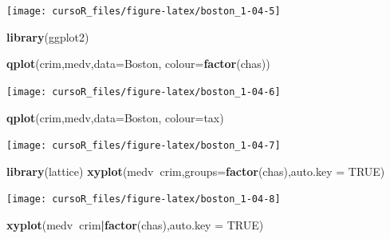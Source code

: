 \documentclass[]{book}
\newenvironment{Shaded}{\begin{snugshade}}{\end{snugshade}}
\newcommand{\KeywordTok}[1]{\textcolor[rgb]{0.13,0.29,0.53}{\textbf{#1}}}
\newcommand{\DataTypeTok}[1]{\textcolor[rgb]{0.13,0.29,0.53}{#1}}
\newcommand{\OtherTok}[1]{\textcolor[rgb]{0.56,0.35,0.01}{#1}}
\newcommand{\OperatorTok}[1]{\textcolor[rgb]{0.81,0.36,0.00}{\textbf{#1}}}
\newcommand{\NormalTok}[1]{#1}
\begin{document}
\begin{center}\texttt{[image: cursoR\_files/figure-latex/boston\_1-04-5]} \end{center}

\begin{Shaded}
\begin{Highlighting}[]
\KeywordTok{library}\NormalTok{(ggplot2)}

\KeywordTok{qplot}\NormalTok{(crim,medv,}\DataTypeTok{data=}\NormalTok{Boston, }\DataTypeTok{colour=}\KeywordTok{factor}\NormalTok{(chas))}
\end{Highlighting}
\end{Shaded}

\begin{center}\texttt{[image: cursoR\_files/figure-latex/boston\_1-04-6]} \end{center}

\begin{Shaded}
\begin{Highlighting}[]
\KeywordTok{qplot}\NormalTok{(crim,medv,}\DataTypeTok{data=}\NormalTok{Boston, }\DataTypeTok{colour=}\NormalTok{tax)}
\end{Highlighting}
\end{Shaded}

\begin{center}\texttt{[image: cursoR\_files/figure-latex/boston\_1-04-7]} \end{center}

\begin{Shaded}
\begin{Highlighting}[]
\KeywordTok{library}\NormalTok{(lattice)}
\KeywordTok{xyplot}\NormalTok{(medv}\OperatorTok{~}\NormalTok{crim,}\DataTypeTok{groups=}\KeywordTok{factor}\NormalTok{(chas),}\DataTypeTok{auto.key =} \OtherTok{TRUE}\NormalTok{)}
\end{Highlighting}
\end{Shaded}

\begin{center}\texttt{[image: cursoR\_files/figure-latex/boston\_1-04-8]} \end{center}

\begin{Shaded}
\begin{Highlighting}[]
\KeywordTok{xyplot}\NormalTok{(medv}\OperatorTok{~}\NormalTok{crim}\OperatorTok{|}\KeywordTok{factor}\NormalTok{(chas),}\DataTypeTok{auto.key =} \OtherTok{TRUE}\NormalTok{)}
\end{Highlighting}
\end{Shaded}
\end{document}
